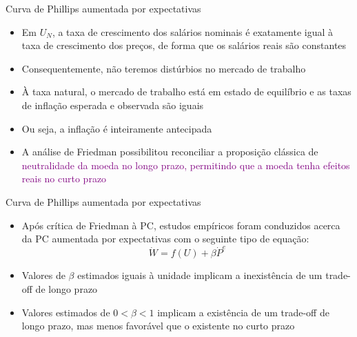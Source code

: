 \documentclass[10pt]{beamer}
\begin{document}
\begin{frame}{Curva de Phillips aumentada por expectativas}
    \begin{itemize}
        \item Em $U_N$, a taxa de crescimento dos salários nominais é exatamente igual à taxa de crescimento dos preços, de forma que os salários reais são constantes
        \bigskip
        \item Consequentemente, não teremos distúrbios no mercado de trabalho
        \bigskip
        \item À taxa natural, o mercado de trabalho está em estado de equilíbrio e as taxas de inflação esperada e observada são iguais
        \bigskip
        \item Ou seja, a inflação é inteiramente antecipada
        \bigskip
        \item A análise de Friedman possibilitou reconciliar a proposição clássica de \textcolor{purple}{neutralidade da moeda no longo prazo, permitindo que a moeda tenha efeitos reais no curto prazo}
    \end{itemize}    
\end{frame}

\begin{frame}{Curva de Phillips aumentada por expectativas}
    \begin{itemize}
        \item Após crítica de Friedman à PC, estudos empíricos foram conduzidos acerca da PC aumentada por expectativas com o seguinte tipo de equação:
        \begin{equation}
            \dot{W} = f(U) + \beta \dot{P}^e
            \label{eq2}
        \end{equation}
        \bigskip
        \item Valores de $\beta$ estimados iguais à unidade implicam a inexistência de um trade-off de longo prazo
        \bigskip
        \item Valores estimados de $0<\beta<1$ implicam a existência de um trade-off de longo prazo, mas menos favorável que o existente no curto prazo
    \end{itemize}    
\end{frame}
\end{document}
